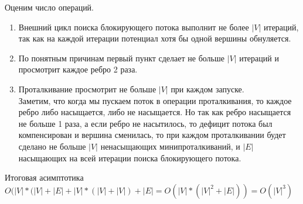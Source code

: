 \documentclass{article}
\begin{document}
     Оценим число операций. \\
     \begin{enumerate}
     \item Внешний цикл поиска блокирующего потока выполнит не более $|V|$ итераций, так как на каждой итерации
     потенциал хотя бы одной вершины обнуляется.
     \item По понятным причинам первый пункт сделает не больше $|V|$ итераций и просмотрит каждое ребро 2 раза.
     \item Проталкивание просмотрит не больше $|V|$ при каждом запуске.\\
        Заметим, что когда мы пускаем поток в операции проталкивания,
        то каждое ребро либо насыщается, либо не насыщается. Но так как 
        ребро насыщается не больше 1 раза, а если ребро не насытилось, то дефицит потока
        был компенсирован и вершина сменилась, то при каждом проталкивании будет сделано не больше 
        $|V|$ ненасыщающих минипроталкиваний, и $|E|$ насыщающих на всей итерации поиска блокирующего 
        потока.
     \end{enumerate}
     Итоговая асимптотика $O(|V| * (|V| + |E| + |V| * (|V| + |V|) + |E| = O(|V| * (|V|^2 + |E|)) = O(|V|^3)$
\end{document}
